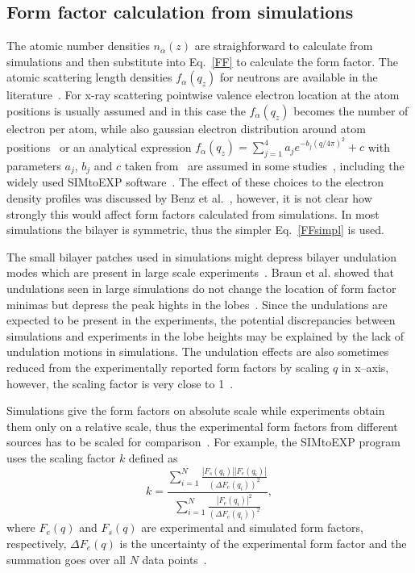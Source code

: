 \documentclass[aps,prl,superscriptaddress,twocolumn]{revtex4}
\begin{document}
\subsection{Form factor calculation from simulations}
The atomic number densities $n_\alpha(z)$ are straighforward to calculate from simulations and
then substitute into Eq.~\ref{FF} to calculate the form factor. The atomic scattering 
length densities $f_\alpha(q_z)$ for neutrons are available in the literature~\cite{sears92}.
For x-ray scattering pointwise valence electron location at the atom positions is usually assumed 
and in this case the $f_\alpha(q_z)$ becomes the number of electron per atom,
while also gaussian electron distribution around atom positions~\cite{benz05} or an analytical expression 
$f_\alpha(q_z)=\sum_{j=1}^4a_je^{-b_j(q/4\pi)^2}+c$ with parameters $a_j$, $b_j$ and $c$ taken from~\cite{cromer68}  
are assumed in some studies~\cite{benz05}, including the widely used SIMtoEXP software~\cite{kucerka10}.
The effect of these choices to the electron density profiles was discussed by Benz et al.~\cite{benz05}, 
however, it is not clear how strongly this would affect form factors calculated from simulations.
In most simulations the bilayer is symmetric, thus the simpler Eq.~\ref{FFsimpl} is used. 

The small bilayer patches used in simulations might depress bilayer undulation modes which are present in large 
scale experiments~\cite{braun11}. Braun et al. showed that undulations seen in large simulations do
not change the location of form factor minimas but depress the peak hights in the lobes~\cite{braun11}.
Since the undulations are expected to be present in the experiments, the potential discrepancies 
between simulations and experiments in the lobe heights may be explained by the lack of undulation 
motions in simulations. The undulation effects are also sometimes reduced from the experimentally 
reported form factors by scaling $q$ in x--axis, however, the scaling factor is very close to 1~\cite{kucerka05a}.

Simulations give the form factors on absolute scale while experiments obtain them only on a relative scale,
thus the experimental form factors from different sources has to be scaled for comparison~\cite{kucerka08a,kucerka10}.
For example, the SIMtoEXP program uses the scaling factor $k$ defined as 
\begin{equation}
k=\frac{\sum_{i=1}^N\frac{|F_s(q_i)||F_e(q_i)|}{(\Delta F_e(q_i))^2}}{\sum_{i=1}^N\frac{|F_e(q_i)|^2}{(\Delta F_e(q_i))^2}},
\end{equation} 
where $F_e(q)$ and $F_s(q)$ are experimental and simulated form factors, respectively, $\Delta F_e(q)$ is the uncertainty
of the experimental form factor and the summation goes over all $N$ data points~\cite{kucerka08a,kucerka10}.
\end{document}
